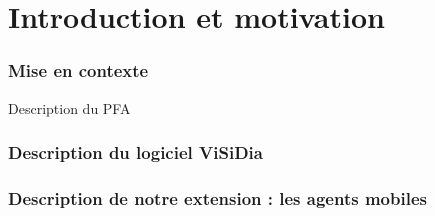 \chapter{Introduction et motivation}

\subsection{Mise en contexte}

Description du PFA

\subsection{Description du logiciel ViSiDia}



\subsection{Description de notre extension : les agents mobiles}




